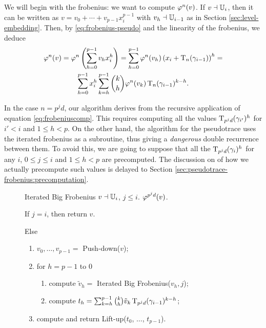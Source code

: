 We will begin with the frobenius: we want to compute $\varphi^n(v)$. If
$v\dashv\mathbb{U}_i$, then it can be written as $v=v_0+\cdots+v_{p-1}x_i^{p-1}$
with $v_h\dashv\mathbb{U}_{i-1}$ as in Section \ref{sec:level-embedding}. Then,
by \eqref{eq:frobenius-pseudo} and the linearity of the frobenius, we
deduce
\begin{multline}
  \label{eq:frobeniuscomp}
  \varphi^n(v) = \varphi^n\left(\sum_{h=0}^{p-1} v_{h}x_i^{h}\right) =
  \sum_{h=0}^{p-1} \varphi^n(v_h)\left(x_i + \operatorname{T}_n(\gamma_{i-1})\right)^{h} =\\
  \sum_{h=0}^{p-1} x_i^h \sum_{k=h}^{p-1}
  \binom{k}{h}\varphi^n(v_k)\operatorname{T}_n(\gamma_{i-1})^{k-h}
  \text{.}
\end{multline}

In the case $n=p^jd$, our algorithm derives from the recursive
application of equation \eqref{eq:frobeniuscomp}. This requires
computing all the values $\operatorname{T}_{p^jd}(\gamma_{i'})^h$ for $i'<i$ and
$1\le h<p$. On the other hand, the algorithm for the pseudotrace uses
the iterated frobenius as a subroutine, thus giving a \emph{dangerous}
double recurrence between them. To avoid this, we are going to suppose
that all the $\operatorname{T}_{p^jd}(\gamma_{i})^h$ for any $i$, $0\le j\le i$
and $1\le h < p$ are precomputed. The discussion on of how we actually
precompute such values is delayed to Section
\ref{sec:pseudotrace-frobenius:precomputation}.

\begin{figure}[!htb]
  \begin{algorithm}
    {Iterated Big Frobenius}
    {$v\dashv\mathbb{U}_i$, $j\le i$.}
    {$\varphi^{p^jd}(v)$.}
  \item \label{alg:frob:base} If $j = i$, then return $v$.
  \item Else
    \begin{enumerate}
    \item \label{alg:frob:push} $v_0, \ldots, v_{p-1} = $
      Push-down($v$);
    \item \label{alg:frob:for} for $h = p-1$ to $0$
      \begin{enumerate}
      \item \label{alg:frob:rec} compute $\tilde{v}_h = $ Iterated
	Big Frobenius($v_h, j$);
      \item \label{alg:frob:comp} compute $t_h = \sum_{k=h}^{p-1}
	\binom{k}{h}\tilde{v}_k\operatorname{T}_{p^jd}(\gamma_{i-1})^{k-h}$;
      \end{enumerate}
    \item \label{alg:frob:lift} compute and return Lift-up($t_0$,
    $\ldots$, $t_{p-1}$).
    \end{enumerate}
  \end{algorithm}
\end{figure}

